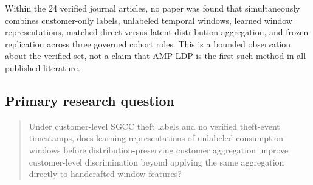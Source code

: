 Within the 24 verified journal articles, no paper was found that simultaneously combines customer-only labels, unlabeled temporal windows, learned window representations, matched direct-versus-latent distribution aggregation, and frozen replication across three governed cohort roles. This is a bounded observation about the verified set, not a claim that AMP-LDP is the first such method in all published literature.

\subsection{Primary research question}

\begin{quote}
Under customer-level SGCC theft labels and no verified theft-event timestamps, does learning representations of unlabeled consumption windows before distribution-preserving customer aggregation improve customer-level discrimination beyond applying the same aggregation directly to handcrafted window features?
\end{quote}
